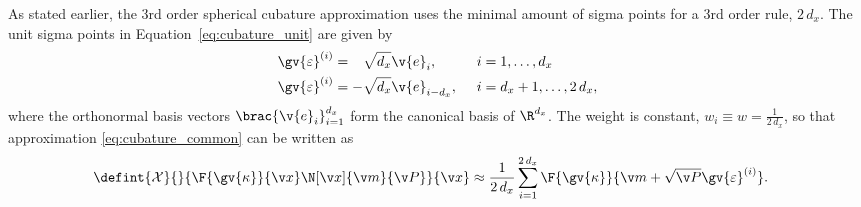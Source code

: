 As stated earlier, the 3rd order spherical cubature approximation uses the minimal amount
of sigma points for a 3rd order rule, $2\,d_x$. The unit sigma points in Equation~\eqref{eq:cubature_unit} are given by
\begin{align}
\begin{aligned}
	\gv{\varepsilon}^{(i)}& = \hphantom{-}\sqrt{d_x}\v{e}_i, \qquad &  i&=1,\dots,d_x\\
	\gv{\varepsilon}^{(i)}& = -\sqrt{d_x}\v{e}_{i-d_x}, & i&=d_x+1,\dots,2\,d_x,
\end{aligned}
	\label{eq:ckf_sigma}
\end{align}
where the orthonormal basis vectors $\brac{\v{e}_i}_{i=1}^{d_x}$ form the canonical basis of $\R^{d_x}$. 
The weight is constant, $w_i\equiv w=\frac{1}{2\,d_x}$,
so that approximation \eqref{eq:cubature_common} can be written as
\begin{align}%
	\defint{\mathcal{X}}{}{\F{\gv{\kappa}}{\x}\N[\x]{\m}{\P}}{\x} &\approx 
	\frac{1}{2\,d_x} \sum_{i=1}^{2\,d_x} \F{\gv{\kappa}}{\m+\sqrt{\P}\gv{\varepsilon}^{(i)}}.
	\label{eq:ckf_approx}
\end{align}%










